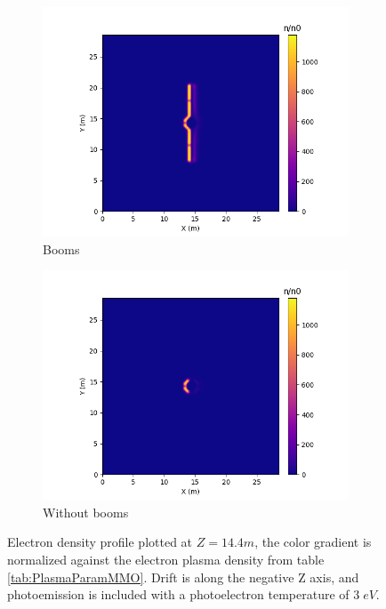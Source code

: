 \begin{figure}[H]
  \begin{subfigure}[b]{0.6\textwidth}
  \includegraphics[width=\textwidth]{figures/MMO/PHTemp/WB/E_PHTemp_WB.png}
  \caption{Booms}
  \label{fig:E_PHTemp_WB}
\end{subfigure}
\begin{subfigure}[b]{0.6\textwidth}
  \includegraphics[width=\textwidth]{figures/MMO/PHTemp/NB/E_PHTemp_NB.png}
  \caption{Without booms}
  \label{fig:E_PHTemp_NB}
\end{subfigure}
\caption{Electron density profile plotted at $Z = 14.4 m$, the color gradient is normalized against the electron plasma density from table \ref{tab:PlasmaParamMMO}. Drift is along the negative Z axis, and photoemission is included with a photoelectron temperature of $3 \; eV$.}
\label{fig:Elec_PHTemp}
\end{figure}


